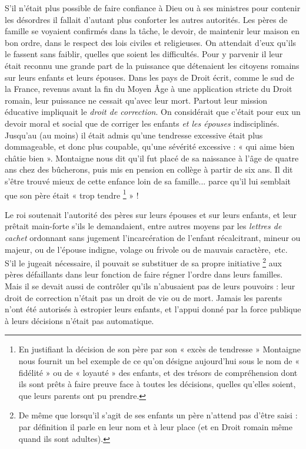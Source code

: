     
    S'il n'était plus possible de faire confiance à Dieu ou à ses ministres pour contenir les désordres il fallait d'autant plus conforter les autres autorités. Les pères de famille se voyaient confirmés dans la tâche, le devoir, de maintenir leur maison en bon ordre, dans le respect des lois civiles et religieuses. On attendait d'eux qu'ils le fassent sans faiblir, quelles que soient les difficultés. Pour y parvenir il leur était reconnu une grande part de la puissance que détenaient les citoyens romains sur leurs enfants et leurs épouses. Dans les pays de Droit écrit, comme le sud de la France, revenus avant la fin du Moyen Âge à une application stricte du Droit romain, leur puissance ne cessait qu'avec leur mort. Partout leur mission éducative impliquait le \emph{droit de correction}. On considérait que c'était pour eux un devoir moral et social que de corriger les enfants \emph{et les épouses} indisciplinés. Jusqu'au  (au moins) il était admis qu'une tendresse excessive était plus dommageable, et donc plus coupable, qu'une sévérité excessive : « {qui aime bien châtie bien} ». Montaigne nous dit qu'il fut placé de sa naissance à l'âge de quatre ans chez des bûcherons, puis mis en pension en collège à partir de six ans. Il dit s'être trouvé mieux de cette enfance loin de sa famille... parce qu'il lui semblait que son père était « trop tendre%
\footnote{En justifiant la décision de son père par son « excès de tendresse » Montaigne nous fournit un bel exemple de ce qu'on désigne aujourd'hui sous le nom de « fidélité » ou de « loyauté » des enfants, et des trésors de compréhension dont ils sont prêts à faire preuve face à toutes les décisions, quelles qu'elles soient, que leurs parents ont pu prendre.} 
» !

 Le roi soutenait l'autorité des pères sur leurs épouses et sur leurs enfants, et leur prêtait main-forte s'ils le demandaient, entre autres moyens par les \emph{lettres de cachet} ordonnant sans jugement l'incarcération de l'enfant récalcitrant, mineur ou majeur, ou de l'épouse indigne, volage ou frivole ou de mauvais caractère,~etc. S'il le jugeait nécessaire, il pouvait se substituer de sa propre initiative%
\footnote{De même que lorsqu'il s'agit de ses enfants un père n'attend pas d'être saisi : par définition il parle en leur nom et à leur place (et en Droit romain même quand ils sont adultes).} 
aux pères défaillants dans leur fonction de faire régner l'ordre dans leurs familles. 
 Mais il se devait aussi de contrôler qu'ils n'abusaient pas de leurs pouvoirs : leur droit de correction n'était pas un droit de vie ou de mort. Jamais les parents n'ont été autorisés à estropier leurs enfants, et l'appui donné par la force publique à leurs décisions n'était pas automatique.

